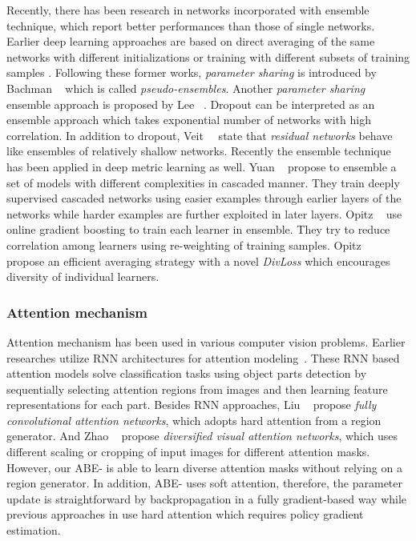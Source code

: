 \documentclass[runningheads]{llncs}
\begin{document}
Recently, there has been research in networks incorporated with ensemble technique, which report better performances than those of single networks.
Earlier deep learning approaches are based on direct averaging of the same networks with different initializations \cite{lee2015deeply,russakovsky2015imagenet} or training with different subsets of training samples \cite{Szegedy_2015_CVPR,sutskever2014sequence}.
Following these former works, \emph{parameter sharing} is introduced by Bachman \etal~\cite{bachman2014learning} which is called \emph{pseudo-ensembles}.
Another \emph{parameter sharing} ensemble approach is proposed by Lee \etal~\cite{lee2015m}.
Dropout \cite{srivastava2014dropout} can be interpreted as an ensemble approach which takes exponential number of networks with high correlation.
In addition to dropout, Veit~\etal~\cite{veit2016residual} state that \emph{residual networks} behave like ensembles of relatively shallow networks.
Recently the ensemble technique has been applied in deep metric learning as well.
Yuan \etal~\cite{yuan2016hard} propose to ensemble a set of models with different complexities in cascaded manner.
They train deeply supervised cascaded networks using easier examples through earlier layers of the networks while harder examples are further exploited in later layers.
Opitz \etal~\cite{opitz2017bier} use online gradient boosting to train each learner in ensemble.
They try to reduce correlation among learners using re-weighting of training samples.
Opitz \etal~\cite{opitz2016efficient} propose an efficient averaging strategy with a novel \emph{DivLoss} which encourages diversity of individual learners.


\vspace{-5mm}
\subsubsection{Attention mechanism}
\label{sec:related-attention}
Attention mechanism has been used in various computer vision problems.
Earlier researches utilize RNN architectures for attention modeling~\cite{sermanet2014attention,mnih2014recurrent,ba2014multiple}.
These RNN based attention models solve classification tasks using object parts detection by sequentially selecting attention regions from images and then learning feature representations for each part.
Besides RNN approaches, Liu \etal~\cite{liu2016fully} propose \emph{fully convolutional attention networks}, which adopts hard attention from a region generator.
And Zhao \etal~\cite{zhao2017diversified} propose \emph{diversified visual attention networks}, which uses different scaling or cropping of input images for different attention masks.
However, our ABE- is able to learn diverse attention masks without relying on a region generator.
In addition, ABE- uses soft attention, therefore, the parameter update is straightforward by backpropagation in a fully gradient-based way while previous approaches in \cite{sermanet2014attention,mnih2014recurrent,ba2014multiple,liu2016fully,zhao2017diversified} use hard attention which requires policy gradient estimation.
\end{document}
